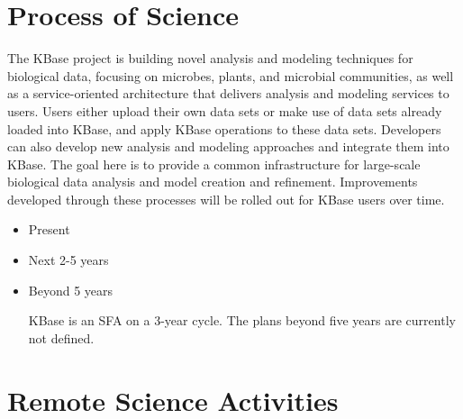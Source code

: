 \documentclass[10pt,a4paper]{report}
\begin{document}
\section{Process of Science}
The KBase project is building novel analysis and modeling techniques for biological data, 
focusing on microbes, plants, and microbial communities, as well as a 
service-oriented architecture that delivers analysis and modeling services to users. Users either upload 
their own data sets or make use of data sets already loaded into KBase, and apply KBase 
operations to these data sets.  Developers can also develop new analysis and modeling approaches and integrate them 
into KBase. The goal here is to provide a common infrastructure for 
large-scale biological data analysis and model creation and refinement. Improvements developed 
through these processes will be rolled out for KBase users over time.

\begin{itemize}
\item Present
\item Next 2-5 years
\item Beyond 5 years

KBase is an SFA on a 3-year cycle.  The plans beyond five years are currently not defined.

\end{itemize}

\section{Remote Science Activities}
\label{sec:kbase-rsa}
\end{document}
